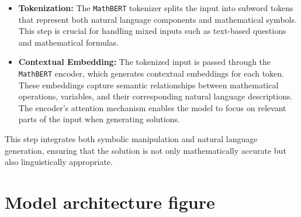 \documentclass{article}
\begin{document}
\begin{itemize}
    \item \textbf{Tokenization:} The \texttt{MathBERT} tokenizer splits the input into subword tokens that represent both natural language components and mathematical symbols. This step is crucial for handling mixed inputs such as text-based questions and mathematical formulas.
    \item \textbf{Contextual Embedding:} The tokenized input is passed through the \texttt{MathBERT} encoder, which generates contextual embeddings for each token. These embeddings capture semantic relationships between mathematical operations, variables, and their corresponding natural language descriptions. The encoder's attention mechanism enables the model to focus on relevant parts of the input when generating solutions.
\end{itemize}




This step integrates both symbolic manipulation and natural language generation, ensuring that the solution is not only mathematically accurate but also linguistically appropriate.

\newpage

\section{Model architecture figure}
\end{document}
